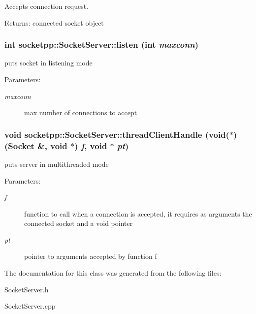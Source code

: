 Accepts connection request. 

\begin{Desc}
\item[Returns:]connected socket object \end{Desc}
\hypertarget{classsocketpp_1_1SocketServer_034ddc2def5342b5a26264ffcb9e8e36}{
\subsubsection{\setlength{\rightskip}{0pt plus 5cm}int socketpp::SocketServer::listen (int {\em maxconn})}}
\label{classsocketpp_1_1SocketServer_034ddc2def5342b5a26264ffcb9e8e36}


puts socket in listening mode 

\begin{Desc}
\item[Parameters:]
\begin{description}
\item[{\em maxconn}]max number of connections to accept \end{description}
\end{Desc}
\hypertarget{classsocketpp_1_1SocketServer_0ded92a6348a6cf953d9f646fac43ac2}{
\subsubsection{\setlength{\rightskip}{0pt plus 5cm}void socketpp::SocketServer::threadClientHandle (void($\ast$)({\bf Socket} \&, void $\ast$) {\em f}, \/  void $\ast$ {\em pt})}}
\label{classsocketpp_1_1SocketServer_0ded92a6348a6cf953d9f646fac43ac2}


puts server in multithreaded mode 

\begin{Desc}
\item[Parameters:]
\begin{description}
\item[{\em f}]function to call when a connection is accepted, it requires as arguments the connected socket and a void pointer \item[{\em pt}]pointer to arguments accepted by function f \end{description}
\end{Desc}


The documentation for this class was generated from the following files:\begin{CompactItemize}
\item 
SocketServer.h\item 
SocketServer.cpp\end{CompactItemize}
